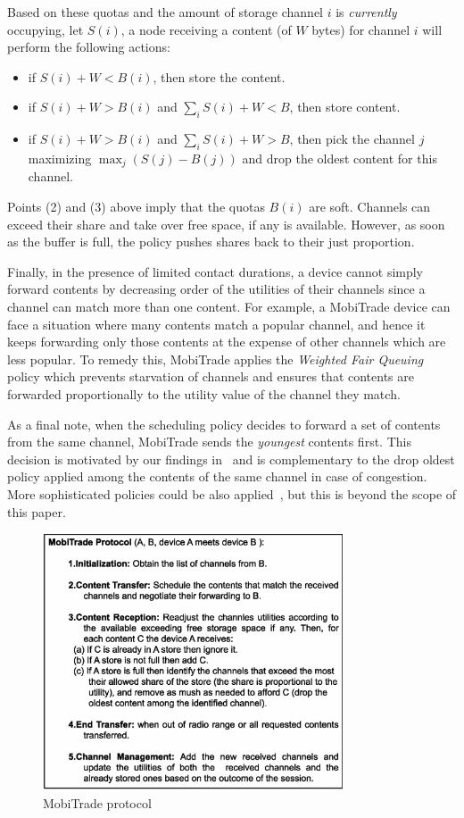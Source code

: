 Based on these quotas and the amount of storage channel $i$ is \emph{currently} occupying, let $S(i)$, a node receiving a content (of $W$ bytes) for channel $i$ will perform the following actions:
\begin{itemize}
\item if $S(i) + W < B(i)$, then store the content.
\item if $S(i) + W > B(i)$ and $\sum_{i} S(i) + W < B$, then store content.
\item if $S(i) + W > B(i)$ and $\sum_{i} S(i) + W > B$, then pick the channel $j$ maximizing $\max_{j} (S(j) - B(j))$ and drop the oldest content for this channel.
\end{itemize}
Points (2) and (3) above imply that the quotas $B(i)$ are soft. Channels can exceed their share and take over free space, if any is available. However, as soon as the buffer is full, the policy pushes shares back to their just proportion.

Finally, in the presence of limited contact durations, a device cannot simply forward contents by decreasing order of the utilities of their channels since a channel can match more than one content. For example, a MobiTrade device can face a situation where many contents match a popular channel, and hence it keeps forwarding only those contents at the expense of other channels which are less popular. To remedy this, MobiTrade applies the \emph{Weighted Fair Queuing} policy which prevents starvation of channels and ensures that contents are forwarded proportionally to the utility value of the channel they match. 

As a final note, when the scheduling policy decides to forward a set of contents from the same channel, MobiTrade sends the \emph{youngest} contents first. This decision is motivated by our findings in~\cite{TMC:Report} and is complementary to the drop oldest policy applied among the contents of the same channel in case of congestion. More sophisticated policies could be also applied~\cite{TMC:Report}, but this is beyond the scope of this paper.

\begin{figure}
\centering
\includegraphics[width=3.5in,height=3in]{Chapitre5/MobiTrade-Protocol.eps}
\vspace{-0.1in}
\caption{MobiTrade protocol}
\label{protocol}
\vspace{-0.1in}
\end{figure}

